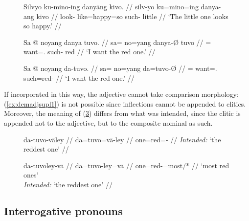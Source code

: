 \begin{figure}
\pex\label{ex:danyaadj}
\a\begingl
	\gla Silvyo ku-mino-ing danyāng kivo. //
	\glb silv-yo ku=mino=ing danya-ang kivo //
	\glc look-\TsgN{} like=happy=so such-\Aarg{} little //
	\glft `The little one looks so happy.' //
\endgl

\a\label{ex:danyatop}\begingl
	\gla Sa @ noyang danya tuvo. //
	\glb sa= no=yang danya-Ø tuvo //
	\glc \PatT{}= want=\Fsg{}.\Aarg{} such-\Top{} red //
	\glft `I want the red one.' //
\endgl
\xe
\end{figure}

\begin{figure}[h]
\ex\label{ex:redone}\begingl
	\gla Sa @ noyang da-tuvo. //
	\glb sa= no=yang da=tuvo-Ø //
	\glc \PatT{}= want=\Fsg{}.\Aarg{} such=red-\Top{} //
	\glft `I want the red one.' //
\endgl\xe
\end{figure}

If incorporated in this way, the adjective cannot take comparison morphology:
(\ref{ex:demadjsupl1}) is not possible since inflections cannot be appended to
clitics.
Moreover, the meaning of (\ref{ex:demadjsupl2}) differs from what was
intended, since the  clitic is appended not to the adjective,
but to the composite nominal as such.

\begin{figure}[h]
\pex
\a\label{ex:demadjsupl1}\ljudge*\begingl
	\gla da-tuvo-vāley //
	\glb da=tuvo=vā-ley //
	\glc one=red=\Supl{}-\PargI{} //
	\glft \textit{Intended:} `the reddest one' //
\endgl

\a\label{ex:demadjsupl2}\ljudge\excl\begingl
	\gla da-tuvoley-vā //
	\glb da=tuvo-ley=vā //
	\glc one=red-\PargI{}=most/*\Supl{} //
	\glft `most red ones' \\
		\textit{Intended:} `the reddest one' //
\endgl
\xe
\end{figure}


\subsection{Interrogative pronouns}
\label{subsec:interpro}

